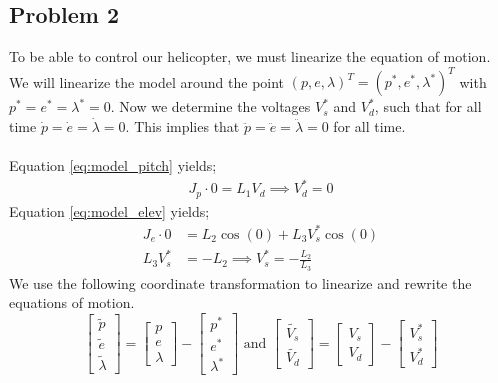 \subsection{Problem 2}\label{subsec:P1p2}
To be able to control our helicopter, we must linearize the equation of motion. We will linearize the model around the point $(p,e,\lambda)^T=(p^*,e^*,\lambda^*)^T$ with $p^*=e^*=\lambda^*=0$. Now we determine the voltages $V_s^*$ and $V_d^*$, such that for all time $\dot{p} = \dot{e} = \dot{\lambda} = 0$. 
This implies that $\ddot{p} = \ddot{e} = \ddot{\lambda} = 0$ for all time. \\
\\Equation \eqref{eq:model_pitch} yields;
\begin{align}
    J_p \cdot 0 = L_1 V_d \implies V_d^* = 0
\end{align}
Equation \eqref{eq:model_elev} yields;
\begin{align}
    J_e \cdot 0 &= L_2 \cos(0) + L_3 V_s^* \cos(0) \nonumber \\
    L_3 V_s^* &= - L_2 \implies V_s^* = -\frac{L_2}{L_3}\label{eq:vs_tilde}
\end{align}
We use the following coordinate transformation to linearize and rewrite the equations of motion. 
\begin{equation}\label{eq: coord_trans}
    \begin{bmatrix} 
        \tilde{p} \\ \tilde{e} \\ \tilde{\lambda}
    \end{bmatrix}
    =
    \begin{bmatrix} 
        p \\ e \\ \lambda
    \end{bmatrix}
    -
    \begin{bmatrix} 
        p^* \\ e^* \\ \lambda^*
    \end{bmatrix}
    \text{ and }
    \begin{bmatrix}
        \tilde{V_s} \\ \tilde{V_d}
    \end{bmatrix}
    =
    \begin{bmatrix}
        V_s \\ V_d
    \end{bmatrix}
    -
    \begin{bmatrix}
        V_s^* \\ V_d^*
    \end{bmatrix}
\end{equation}




